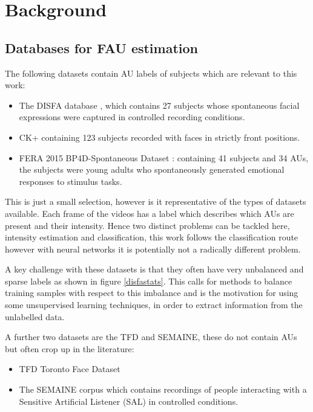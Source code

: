 \chapter{Background}

\section{Databases for FAU estimation}
The following datasets contain AU labels of subjects which are relevant to this work:

\begin{itemize}
    \item The DISFA database \cite{disfa}, which contains 27 subjects whose spontaneous
          facial expressions were captured in controlled recording conditions.
    \item CK+ \cite{Lucey2010} containing 123 subjects recorded with faces in strictly front positions.
    \item FERA 2015 BP4D-Spontaneous Dataset \cite{Valstar}:
          containing 41 subjects and 34 AUs, the subjects were young adults who
          spontaneously generated emotional responses to stimulus tasks.
\end{itemize}

This is just a small selection, however is it representative of the types of
datasets available. Each frame of the videos has a label which describes which AUs are
present and their intensity. Hence two distinct problems can be tackled here, intensity
estimation and classification, this work follows the classification route however
with neural networks it is potentially not a radically different problem.

A key challenge with these datasets is that they often have very unbalanced and
sparse labels as shown in figure \ref{disfastats}. This calls for methods
to balance training samples with respect to this imbalance and is the
motivation for using some unsupervised learning techniques, in order to extract information
from the unlabelled data.

A further two datasets are the TFD and SEMAINE, these do not contain AUs but often crop up in the
literature:
\begin{itemize}
     \item TFD \cite{tfd} Toronto Face Dataset
     \item The SEMAINE \cite{semaine} corpus which contains recordings
           of people interacting with a Sensitive Artificial Listener (SAL) in controlled conditions.
\end{itemize}

